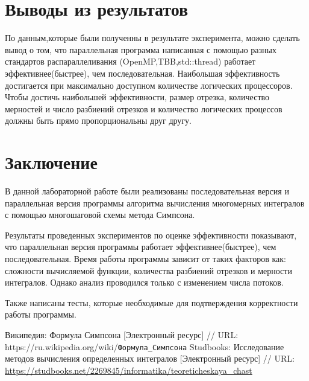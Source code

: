 \documentclass{report}
\begin{document}
\section*{Выводы из результатов}
\par По данным,которые были полученны в результате  эксперимента, можно сделать вывод о том, что  параллельная программа написанная с помощью разных стандартов распараллеливания (OpenMP,TBB,std::thread) работает эффективнее(быстрее), чем последовательная. Наибольшая эффективность достигается при
максимально доступном количестве логических процессоров. Чтобы достичь наибольшей эффективности, размер отрезка, количество мерностей и число разбиений отрезков и количество логических процессов должны быть прямо пропорциональны друг другу.
\newpage

\section*{Заключение}
В данной лабораторной работе были реализованы последовательная версия и параллельная версия программы алгоритма вычисления многомерных интегралов с помощью многошаговой схемы метода Симпсона.
\par Результаты проведенных экспериментов по оценке эффективности показывают, что параллельная версия программы работает эффективнее(быстрее), чем последовательная. Время работы программы  зависит от таких факторов как: сложности вычисляемой функции, количества разбиений отрезков и мерности интегралов. Однако анализ проводился только с изменением числа потоков.
\par Также написаны тесты, которые необходимые для подтверждения корректности работы программы.
\newpage

\begin{thebibliography}{1}
 Википедия: Формула Симпсона [Электронный ресурс] // URL: https://ru.wikipedia.org/wiki/\verb|Формула_Симпсона|
 Studbooks: Исследование методов вычисления определенных интегралов [Электронный ресурс] // URL: \url {https://studbooks.net/2269845/informatika/teoreticheskaya_chast}
\end{thebibliography}
\newpage

\end{document}
